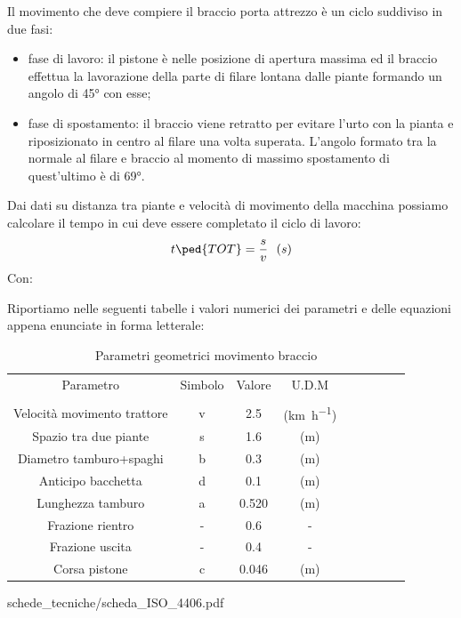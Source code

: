 \documentclass[a4paper,12pt]{article}
\begin{document}
Il movimento che deve compiere il braccio porta attrezzo è un ciclo suddiviso in due fasi:
\begin{itemize}
	\item fase di lavoro: il pistone è nelle posizione di apertura massima ed il braccio effettua la lavorazione della parte di filare lontana dalle piante formando un angolo di 45\si{\degree} con esse;
	\item fase di spostamento: il braccio viene retratto per evitare l'urto con la pianta e riposizionato in centro al filare una volta superata. L'angolo formato tra la normale al filare e braccio al momento di massimo spostamento di quest'ultimo è di 69\si{\degree}.
	\end{itemize} 

Dai dati su distanza tra piante e velocità di movimento della macchina possiamo calcolare il tempo in cui deve essere completato il ciclo di lavoro:
\begin{equation}
t \ped{TOT} = \frac{s}{v} \ \  (s)
\label{t_TOT_1}
\end{equation}
Con:

Riportiamo nelle seguenti tabelle i valori numerici dei parametri e delle equazioni appena enunciate in forma letterale:
\begin{table}[H]
\centering
\begin{tabular}{ |c|c|c|c|c|c|c|c|c| } 
\hline
 Parametro & Simbolo & Valore & U.D.M   \\ 
 & &  &\\
 Velocità movimento trattore & v & 2.5 & (\si{\kilo \meter \per \hour})   \\ 
Spazio tra due piante & s & 1.6 & (\si{\meter})  \\
 Diametro tamburo+spaghi & b & 0.3 &  (\si{\meter})  \\
 Anticipo bacchetta & d & 0.1 & (\si{\meter})  \\
Lunghezza tamburo & a & 0.520 & (\si{\meter})  \\
 Frazione rientro & - & 0.6 & -  \\
 Frazione uscita & - & 0.4 & -  \\
 Corsa pistone & c & 0.046 & (\si{\meter})  \\
 \hline
\end{tabular}
\caption{Parametri geometrici movimento braccio}
    \label{tab_geometrici_braccio}
\end{table}
\medskip


 {schede_tecniche/scheda_ISO_4406.pdf}
\end{document}
